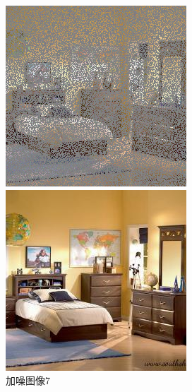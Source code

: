 \begin{figure}[H]
  \centering
  \begin{minipage}[b]{0.3\linewidth}
\includegraphics[width=\linewidth]{Picture/input/00009.png}
    \caption{加噪图像7}
    \label{noised image 7 }
  \end{minipage}
  \hspace{0.1cm} %
   \begin{minipage}[b]{0.3\linewidth}
    \includegraphics[width=\linewidth]{Picture/label/00009.png}

\end{minipage}
\end{figure}
